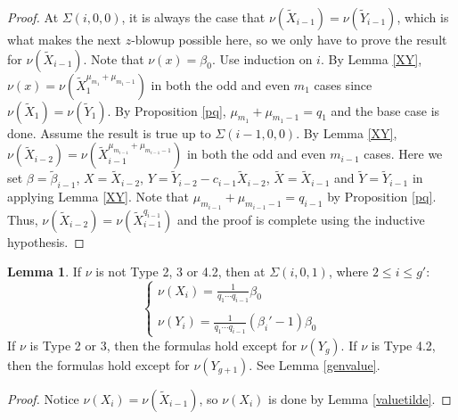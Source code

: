 \documentclass[11pt]{amsart}
\theoremstyle{definition}
\newtheorem{lem}[thm]{Lemma}
\begin{document}
{\begin{proof}
  At $\displaystyle \Sigma(i,0,0)$, it is always the case that $\nu(\tilde X_{i-1}) = \nu(\tilde Y_{i-1})$, which is what makes the next $z$-blowup possible here, so we only have to prove the result for $\nu(\tilde X_{i-1})$. Note that $\nu(x)=\beta_0$. Use induction on $i$. By Lemma \ref{XY}, $\nu(x)=\nu\left(\tilde X_{1}^{\mu_{m_1}+\mu_{m_1-1}}\right)$ in both the odd and even $m_1$ cases since $\nu(\tilde X_{1})=\nu(\tilde Y_{1})$. By Proposition \ref{pq}, $\mu_{m_1}+\mu_{m_1-1}=q_1$ and the base case is done. Assume the result is true up to $\Sigma(i-1,0,0)$. By Lemma \ref{XY}, $\nu(\tilde X_{i-2})=\nu\left(\tilde X_{i-1}^{\mu_{m_{i-1}}+\mu_{m_{i-1}-1}}\right)$ in both the odd and even $m_{i-1}$ cases. Here we set $\beta=\tilde \beta_{i-1}$, $X=\tilde X_{i-2}$, $Y=\tilde Y_{i-2}-c_{i-1}\tilde X_{i-2}$, $\tilde X=\tilde X_{i-1}$ and $\tilde Y=\tilde Y_{i-1}$ in applying Lemma \ref{XY}. Note that $\mu_{m_{i-1}}+\mu_{m_{i-1}-1}=q_{i-1}$ by Proposition \ref{pq}. Thus, $\nu(\tilde X_{i-2})=\nu\left(\tilde X_{i-1}^{q_{i-1}}\right)$ and the proof is complete using the inductive hypothesis.
\end{proof}

\begin{lem} \label{beta'-1} If $\nu$ is not Type 2, 3 or 4.2, then at $\Sigma(i,0,1)$, where $2\leq i \leq g'$:
\begin{equation*}
\left\{
\begin{array}{l}
\displaystyle \nu(X_i)=\frac{1}{q_1\cdots q_{i-1}}\beta_0
\\\\
\displaystyle \nu(Y_i)=\frac{1}{q_1\cdots q_{i-1}}\left(\beta_i'-1\right)\beta_0
\end{array}
\right.
\end{equation*}
If $\nu$ is Type 2 or 3, then the formulas hold except for $\nu(Y_g)$. If $\nu$ is Type 4.2, then the formulas hold except for $\nu(Y_{g+1})$. See Lemma \ref{genvalue}.
\end{lem}
\begin{proof}
Notice $\nu(X_i)=\nu(\tilde X_{i-1})$, so $\nu(X_i)$ is done by Lemma \ref{valuetilde}.


\end{proof}}
\end{document}
